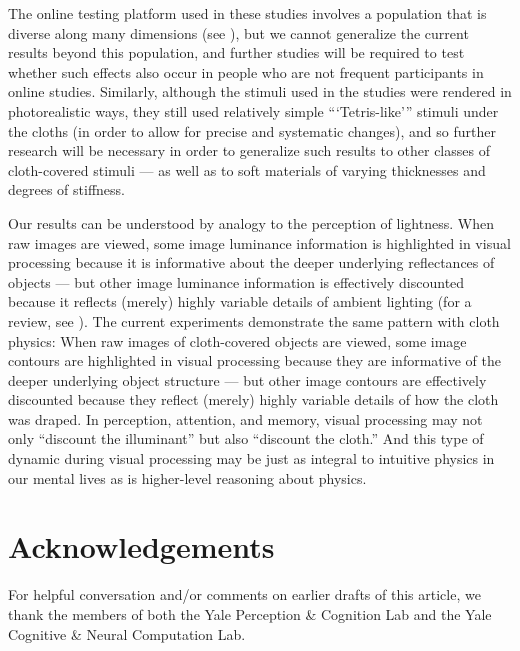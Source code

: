 The online testing platform used in these studies involves a population that is diverse along many dimensions (see \cite{palan_prolificacsubject_2018}), but we cannot generalize the current results beyond this population, and further studies will be required to test whether such effects also occur in people who are not frequent participants in online studies. Similarly, although the stimuli used in the studies were rendered in photorealistic ways, they still used relatively simple “‘Tetris-like’” stimuli under the cloths (in order to allow for precise and systematic changes), and so further research will be necessary in order to generalize such results to other classes of cloth-covered stimuli --- as well as to soft materials of varying thicknesses and degrees of stiffness.

Our results can be understood by analogy to the perception of lightness. When raw images are viewed, some image luminance information is highlighted in visual processing because it is informative about the deeper underlying reflectances of objects --- but other image luminance information is effectively discounted because it reflects (merely) highly variable details of ambient lighting (for a review, see \cite{adelson_lightness_2000}). The current experiments demonstrate the same pattern with cloth physics: When raw images of cloth-covered objects are viewed, some image contours are highlighted in visual processing because they are informative of the deeper underlying object structure --- but other image contours are effectively discounted because they reflect (merely) highly variable details of how the cloth was draped. In perception, attention, and memory, visual processing may not only “discount the illuminant” but also “discount the cloth.” And this type of dynamic during visual processing may be just as integral to intuitive physics in our mental lives as is higher-level reasoning about physics.


\section{Acknowledgements}

For helpful conversation and/or comments on earlier drafts of this article, we thank the members of both the Yale Perception \& Cognition Lab and the Yale Cognitive \& Neural Computation Lab.